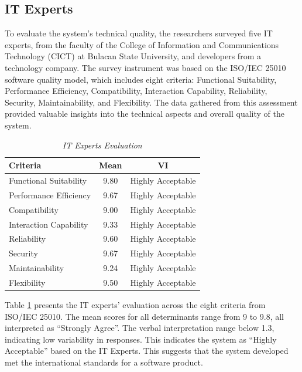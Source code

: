 \subsection{IT Experts}
	To evaluate the system’s technical quality, the researchers surveyed five IT experts, from the faculty of the College of Information and Communications Technology (CICT) at Bulacan State University, and developers from a technology company. The survey instrument was based on the ISO/IEC 25010 software quality model, which includes eight criteria: Functional Suitability, Performance Efficiency, Compatibility, Interaction Capability, Reliability, Security, Maintainability, and Flexibility. The data gathered from this assessment provided valuable insights into the technical aspects and overall quality of the system.
	
	\begin{table}[h!]
		\centering
		\caption{\textit{IT Experts Evaluation}}
		\label{itexpeval}
		\renewcommand{\arraystretch}{1.3}
			\begin{tabular}{p{10cm}cc}
				\hline
				\textbf{Criteria} & \textbf{Mean} & \textbf{VI} \\
				\hline
				Functional Suitability 
				& 9.80 & Highly Acceptable  \\
				Performance Efficiency
				& 9.67 & Highly Acceptable  \\
				Compatibility
				& 9.00 & Highly Acceptable  \\
				Interaction Capability
				& 9.33 & Highly Acceptable  \\
				Reliability
				& 9.60 & Highly Acceptable  \\
				Security
				& 9.67 & Highly Acceptable  \\
				Maintainability
				& 9.24 & Highly Acceptable  \\
				Flexibility
				& 9.50 & Highly Acceptable  \\
				\hline
			\end{tabular}
		
	\end{table}
	
    Table \ref{itexpeval} presents the IT experts' evaluation across the eight criteria from ISO/IEC 25010. The mean scores for all determinants range from 9 to 9.8, all interpreted as “Strongly Agree”. The verbal interpretation range below 1.3, indicating low variability in responses. This indicates the system as “Highly Acceptable” based on the IT Experts. This suggests that the system developed met the international standards for a software product.


